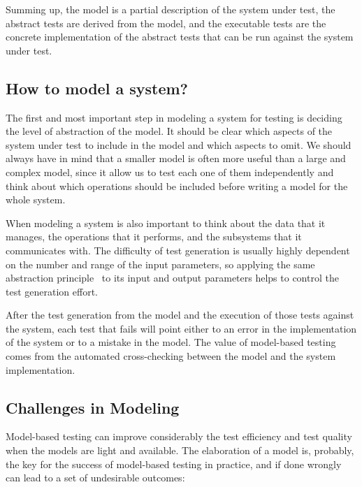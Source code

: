 Summing up, the model is a partial description of the system under test, the abstract tests are derived from the model, and the executable tests are the concrete implementation of the abstract tests that can be run against the system under test.


\subsection{How to model a system?}

The first and most important step in modeling a system for testing is deciding the level of abstraction of the model. It should be clear which aspects of the system under test to include in the model and which aspects to omit. We should always have in mind that a smaller model is often more useful than a large and complex model, since it allow us to test each one of them independently and think about which operations should be included before writing a model for the whole system. 

When modeling a system is also important to think about the data that it manages, the operations that it performs, and the subsystems that it communicates with. The difficulty of test generation is usually highly dependent on the number and range of the input parameters, so applying the same abstraction principle~\cite{Mosley2002} to its input and output parameters helps to control the test generation effort.

After the test generation from the model and the execution of those tests against the system, each test that fails will point either to an error in the implementation of the system or to a mistake in the model. The value of model-based testing comes from the automated cross-checking between the model and the system implementation.
 
\subsection{Challenges in Modeling}
Model-based testing can improve considerably the test 
efficiency and test quality when the models are light 
and available. The elaboration of a model is, probably, 
the key for the success of model-based testing in practice,
and if done wrongly~\cite{Peleska.2013} can lead to a set of undesirable 
outcomes:

